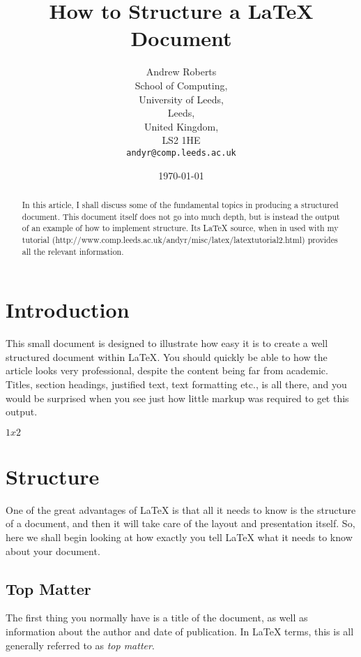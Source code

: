 \documentclass{article}
\begin{document}
\title{How to Structure a \LaTeX{} Document} %
\author{Andrew Roberts\\
    School of Computing,\\
		University of Leeds,\\
		Leeds,\\
		United Kingdom,\\
		LS2 1HE\\
		\texttt{andyr@comp.leeds.ac.uk}} %
\date{\today} %
\maketitle

\begin{abstract}
In this article, I shall discuss some of the fundamental topics in
producing a structured document. This document itself does not go into
much depth, but is instead the output of an example of how to implement
structure. Its \LaTeX{} source, when in used with my tutorial
(http://www.comp.leeds.ac.uk/andyr/misc/latex/\-latextutorial2.html)
provides all the relevant information. \end{abstract}

\section{Introduction}
This small document is designed to illustrate how easy it is to create a
well structured document within \LaTeX\cite{lamport94}. You should quickly be able to
how the article looks very professional, despite the content being
far from academic. Titles, section headings, justified text, text
formatting etc., is all there, and you would be surprised when you see
just how little markup was required to get this output.

$1x2$ %

\section{Structure}
One of the great advantages of \LaTeX{} is that all it needs to know is
the structure of a document, and then it will take care of the layout
and presentation itself. So, here we shall begin looking at how exactly
you tell \LaTeX{} what it needs to know about your document.

\subsection{Top Matter}
The first thing you normally have is a title of the document, as well as
information about the author and date of publication. In \LaTeX{} terms,
this is all generally referred to as \emph{top matter}.
\end{document}
